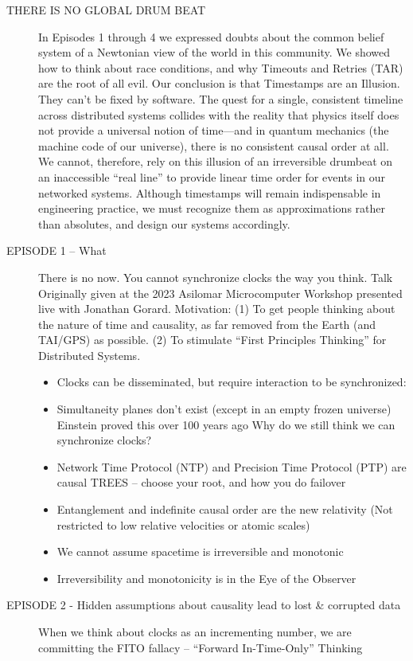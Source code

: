\begin{description}
\item [THERE IS NO GLOBAL DRUM BEAT] In Episodes 1 through 4 we expressed doubts about the common belief system of a Newtonian view of the world in this community. We showed how to think about race conditions, and why Timeouts and Retries (TAR) are the root of all evil. Our conclusion is that Timestamps are an Illusion. They can’t be fixed by software.
The quest for a single, consistent timeline across distributed systems collides with the reality that physics itself does not provide a universal notion of time—and in quantum mechanics (the machine code of our universe), there is no consistent causal order at all. We cannot, therefore, rely on this illusion of an irreversible drumbeat on an inaccessible “real line” to provide linear time order for events in our networked systems.
Although timestamps will remain indispensable in engineering practice, we must recognize them as approximations rather than absolutes, and design our systems accordingly.
\item [EPISODE 1 -- What] There is no now. You cannot synchronize clocks the way you think. Talk Originally given at the 2023 Asilomar Microcomputer Workshop presented live with Jonathan Gorard.
Motivation: (1) To get people thinking about the nature of time and causality, as far removed from the Earth (and TAI/GPS) as possible. (2) To stimulate ``First Principles Thinking'' for Distributed Systems.%
	\begin{itemize}
	\item  Clocks can be disseminated, but require interaction to be synchronized:
	\item  Simultaneity planes don’t exist (except in an empty frozen universe) Einstein proved this over 100 years ago Why do we still think we can synchronize clocks?
	\item  Network Time Protocol (NTP) and Precision Time Protocol (PTP) are causal TREES -- choose your root, and how you do failover
	\item  Entanglement and indefinite causal order are the new relativity (Not restricted to low relative velocities or atomic scales)
	\item  We cannot assume spacetime is irreversible and monotonic
	\item  Irreversibility and monotonicity is in the Eye of the Observer
	\end{itemize}
\item [EPISODE 2 - Hidden assumptions about causality lead to lost \& corrupted data] When we think about clocks as an incrementing number, we are committing the FITO fallacy -- ``Forward In-Time-Only'' Thinking

\end{description}
